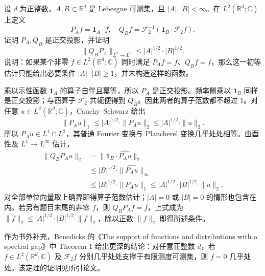 \begin{exercise}\label{b2:ex:04-support-volume}
设 \(d\) 为正整数，\(A,B\subset\mathbb R^d\) 是 Lebesgue 可测集，且 \(|A|,|B|<\infty\)。在 \(L^2(\mathbb R^d;\mathbb C)\) 上定义
\[
 P_Af=\mathbf1_A\cdot f,
 \quad Q_Bf=\mathcal F_2^{-1}(\mathbf1_B\cdot\mathcal F_2f).
\]
证明 \(P_A,Q_B\) 是正交投影，并证明
\[
 \|Q_BP_A\|_{L^2\to L^2}\leq|A|^{1/2}\cdot|B|^{1/2}.
\]
说明：如果某个非零 \(f\in L^2(\mathbb R^d;\mathbb C)\) 同时满足 \(P_Af=f\)、\(Q_Bf=f\)，那么这一初等估计只能给出必要条件 \(|A|\cdot|B|\geq1\)，并未构造这样的函数。
\end{exercise}
\begin{solution}
乘以示性函数 \(\mathbf1_A\) 的算子自伴且幂等，所以 \(P_A\) 是正交投影。频率侧乘以 \(\mathbf1_B\) 同样是正交投影；与酉算子 \(\mathcal F_2\) 共轭便得到 \(Q_B\)。因此两者的算子范数都不超过 \(1\)。对任意 \(u\in L^2(\mathbb R^d;\mathbb C)\)，Cauchy--Schwarz 给出
\[
 \|P_Au\|_1\leq|A|^{1/2}\cdot\|P_Au\|_2
 \leq|A|^{1/2}\cdot\|u\|_2.
\]
所以 \(P_Au\in L^1\cap L^2\)，其普通 Fourier 变换与 Plancherel 变换几乎处处相等。由酉性及 \(L^1\to L^\infty\) 估计，
\[
 \begin{aligned}
 \|Q_BP_Au\|_2
 &=\|\mathbf1_B\cdot\widehat{P_Au}\|_2\\
 &\leq|B|^{1/2}\cdot\|\widehat{P_Au}\|_\infty\\
 &\leq|B|^{1/2}\cdot\|P_Au\|_1
 \leq|A|^{1/2}\cdot|B|^{1/2}\cdot\|u\|_2.
 \end{aligned}
\]
对全部单位向量取上确界即得算子范数估计；\(|A|=0\) 或 \(|B|=0\) 的情形也包含在内。若另有题目末尾的非零 \(f\)，则 \(Q_BP_Af=f\)，上式成为 \(\|f\|_2\leq|A|^{1/2}\cdot|B|^{1/2}\cdot\|f\|_2\)，除以正数 \(\|f\|_2\) 即得所述条件。
\end{solution}

作为书外补充，Benedicks 的《The support of functions and distributions with a spectral gap》\cite[p. 286]{Benedicks1984SpectralGap}中 Theorem 1 给出更深的结论：对任意正整数 \(d\)，若 \(f\in L^2(\mathbb R^d;\mathbb C)\) 及 \(\mathcal F_2f\) 分别几乎处处支撑于有限测度可测集，则 \(f=0\) 几乎处处。该定理的证明见所引论文。

